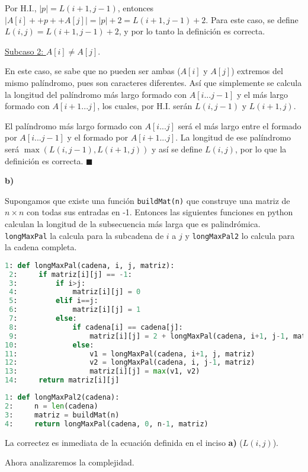 \documentclass{article}
\begin{document}
Por H.I., $|p|=L(i+1, j-1)$, entonces $|A[i]++p++A[j]| = |p|+2 = L(i+1, j-1)+2$. Para este caso, se define $L(i, j) = L(i+1, j-1)+2$, y por lo tanto la definición es correcta.

\underline{Subcaso 2: $A[i] \neq A[j]$}.

En este caso, se sabe que no pueden ser ambas ($A[i]$ y $A[j]$) extremos del mismo palíndromo, pues son caracteres diferentes. Así que simplemente se calcula la longitud del palíndromo más largo formado con $A[i...j-1]$ y el más largo formado con $A[i+1...j]$, los cuales, por H.I. serán $L(i,j-1)$ y $L(i+1,j)$.

El palíndromo más largo formado con $A[i...j]$ será el más largo entre el formado por $A[i...j-1]$ y el formado por $A[i+1...j]$. La longitud de ese palíndromo será $\max (L(i,j-1), L(i+1,j))$ y así se define $L(i,j)$, por lo que la definición es correcta. $\blacksquare$

\textbf{b)}

Supongamos que existe una función \texttt{buildMat(n)} que construye una matriz de $n \times n$ con todas sus entradas en -1. Entonces las siguientes funciones en python calculan la longitud de la subsecuencia más larga que es palindrómica. \texttt{longMaxPal} la calcula para la subcadena de $i$ a $j$ y \texttt{longMaxPal2} lo calcula para la cadena completa.

\begin{lstlisting}[language=Python]
 1: def longMaxPal(cadena, i, j, matriz):
 2:     if matriz[i][j] == -1:
 3:         if i>j:
 4:             matriz[i][j] = 0
 5:         elif i==j:
 6:             matriz[i][j] = 1
 7:         else:
 8:             if cadena[i] == cadena[j]:
 9:                 matriz[i][j] = 2 + longMaxPal(cadena, i+1, j-1, matriz)
10:             else:
11:                 v1 = longMaxPal(cadena, i+1, j, matriz)
12:                 v2 = longMaxPal(cadena, i, j-1, matriz)
13:                 matriz[i][j] = max(v1, v2)
14:     return matriz[i][j]
\end{lstlisting}

\begin{lstlisting}[language=Python]
1: def longMaxPal2(cadena):
2:     n = len(cadena)
3:     matriz = buildMat(n)
4:     return longMaxPal(cadena, 0, n-1, matriz)
\end{lstlisting}


La correctez es inmediata de la ecuación definida en el inciso \textbf{a)}  ($L(i,j)$).

Ahora analizaremos la complejidad.
\end{document}
